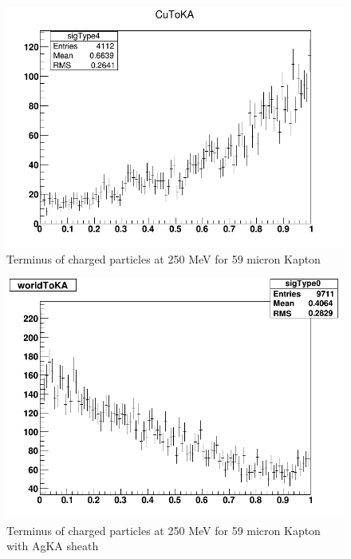 \documentclass{article}
\begin{document}
\begin{figure}[H]
\centering
\includegraphics[width=6in]{figures/Cu_KA/S59/CutoKA.png}
\caption{Terminus of charged particles at 250 MeV for 59 micron Kapton}
\label{fig:G4_stats_c}
\end{figure}

\begin{figure}[H]
\centering
\includegraphics[width=6in]{figures/Cu_KA_AgKA/S59/WorldtoKA.png}
\caption{Terminus of charged particles at 250 MeV for 59 micron Kapton with AgKA sheath}
\label{fig:G4_stats_AgKA_a}
\end{figure}
\end{document}
